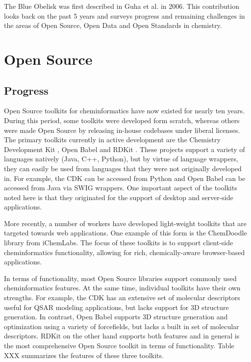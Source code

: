 \documentclass[10pt]{bmc_article}
\newenvironment{bmcformat}{\begin{raggedright}\baselineskip20pt\sloppy\setboolean{publ}{false}}{\end{raggedright}\baselineskip20pt\sloppy}
\begin{document}
\begin{bmcformat}
The Blue Obelisk was first described in Guha et al.\cite{Guha2006} in
2006. This
contribution looks back on the past 5 years and surveys progress and
remaining challenges in the areas of Open Source, Open Data and Open
Standards in chemistry.

\section*{Open Source}
  \subsection*{Progress}

Open Source toolkits for cheminformatics have now existed for nearly
ten years. During this period, some toolkits were developed form
scratch, whereas others were made Open Source by releasing in-house
codebases under liberal licenses. The primary toolkits currently in
active development are the Chemistry Development Kit \cite{Steinbeck2003, Steinbeck2006}, Open Babel \cite{WebOpenBabel} and
RDKit \cite{WebRDKit}. These projects support a variety of languages natively (Java,
C++, Python), but by virtue of language wrappers, they can easily be
used from languages that they were not originally developed in. For
example, the CDK can be accessed from Python and Open Babel can be
accessed from Java via SWIG wrappers. One important aspect of the
toolkits noted here is that they originated for the support of desktop
and server-side applications. 

More recently, a number of workers have developed light-weight
toolkits that are targeted towards web applications. One example of
this form is the ChemDoodle library from iChemLabs. The focus of these
toolkits is to support client-side cheminformatics functionality,
allowing for rich, chemically-aware browser-based applications.

In terms of functionality, most Open Source libraries support commonly
used cheminformatics features. At the same time, individual toolkits
have their own strengths. For example, the CDK has an extensive set of
molecular descriptors useful for QSAR modeling applications, but lacks
support for 3D structure generation. In contrast, Open Babel supports
3D structure generation and optimization using a variety of
forcefields, but lacks a built in set of molecular descriptors. RDKit
on the other hand supports both features and in general is the most
comprehensive Open Source toolkit in terms of functionality. Table XXX
summarizes the features of these three toolkits.


\end{bmcformat}
\end{document}
